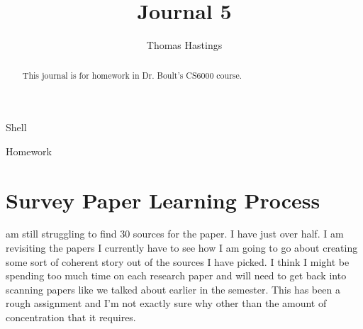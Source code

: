 \documentclass[journal]{IEEEtran}
\begin{document}
  \title{Journal 5}
  \author{Thomas Hastings}%
  
  {Shell}
  \maketitle
  
  \begin{abstract}
  This journal is for homework in Dr. Boult's CS6000 course.
  \end{abstract}
  
  \begin{IEEEkeywords}
  Homework
  \end{IEEEkeywords}
  
  
  \section{Survey Paper Learning Process}
   am still struggling to find 30 sources for the paper. I have just over half. I am revisiting the papers I currently have to see how I am going to go about creating some sort of coherent story out of the sources I have picked. I think I might be spending too much time on each research paper and will need to get back into scanning papers like we talked about earlier in the semester. This has been a rough assignment and I'm not exactly sure why other than the amount of concentration that it requires. 
  
  
  
\end{document}
